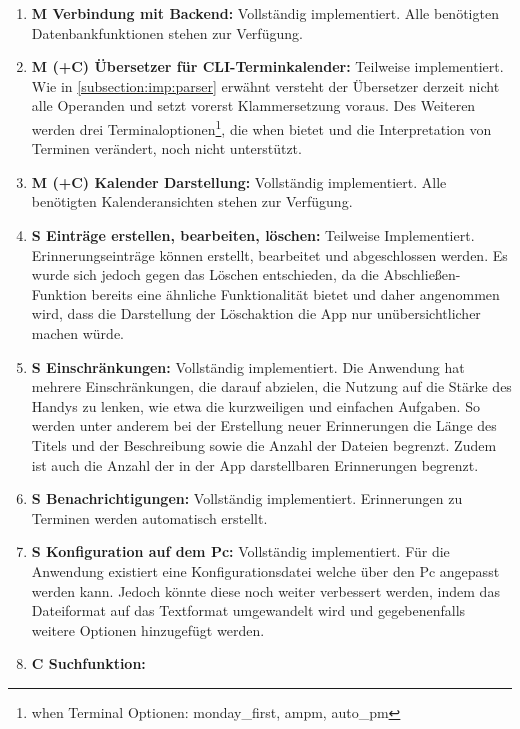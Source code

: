 \begin{enumerate}%
	\item \textbf{M Verbindung mit Backend:} %
		Vollständig implementiert. Alle benötigten Datenbankfunktionen stehen zur Verfügung.%
	\item \textbf{M (+C) Übersetzer für CLI-Terminkalender:} %
		Teilweise implementiert. Wie in \ref{subsection:imp:parser} erwähnt versteht der Übersetzer derzeit nicht alle Operanden und setzt vorerst Klammersetzung voraus. Des Weiteren werden drei Terminaloptionen\footnote{when Terminal Optionen: monday\_first, ampm, auto\_pm\cite{cli_when}}, die \glqq when\grqq{} bietet und die Interpretation von Terminen verändert, noch nicht unterstützt.%
	\item \textbf{M (+C) Kalender Darstellung:} %
		Vollständig implementiert. Alle benötigten Kalenderansichten stehen zur Verfügung. %
	\item \textbf{S Einträge erstellen, bearbeiten, löschen:} %
		Teilweise Implementiert. Erinnerungseinträge können erstellt, bearbeitet und abgeschlossen werden.\newline
		Es wurde sich jedoch gegen das Löschen entschieden, da die Abschließen-Funktion bereits eine ähnliche Funktionalität bietet und daher angenommen wird, dass die Darstellung der Löschaktion die App nur unübersichtlicher machen würde.
	\item \textbf{S Einschränkungen:} %
		Vollständig implementiert. Die Anwendung hat mehrere Einschränkungen, die darauf abzielen, die Nutzung auf die Stärke des Handys zu lenken, wie etwa die kurzweiligen und einfachen Aufgaben. %
		So werden unter anderem bei der Erstellung neuer Erinnerungen die Länge des Titels und der Beschreibung sowie die Anzahl der Dateien begrenzt. Zudem ist auch die Anzahl der in der App darstellbaren Erinnerungen begrenzt.%
	\item \textbf{S Benachrichtigungen:} %
		Vollständig implementiert. Erinnerungen zu Terminen werden automatisch erstellt.%
	\item \textbf{S Konfiguration auf dem Pc:}
		Vollständig implementiert. Für die Anwendung existiert eine Konfigurationsdatei welche über den Pc angepasst werden kann. %
		Jedoch könnte diese noch weiter verbessert werden, indem das Dateiformat auf das Textformat umgewandelt wird und gegebenenfalls weitere Optionen hinzugefügt werden.%
	\item \textbf{C Suchfunktion:} %

\end{enumerate}
